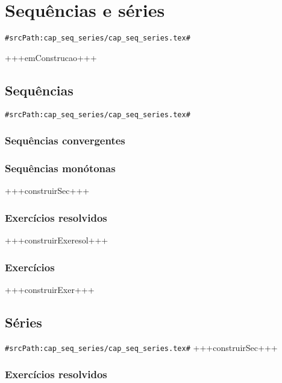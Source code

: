 
\chapter{Sequências e séries}
\verb+#srcPath:cap_seq_series/cap_seq_series.tex#+
\label{cap:seq_series}

+++emConstrucao+++

\section{Sequências}
\verb+#srcPath:cap_seq_series/cap_seq_series.tex#+
\subsection{Sequências convergentes}
\subsection{Sequências monótonas}
+++construirSec+++
\subsection*{Exercícios resolvidos}

+++construirExeresol+++


\subsection*{Exercícios}

+++construirExer+++


\section{Séries}
\verb+#srcPath:cap_seq_series/cap_seq_series.tex#+
+++construirSec+++

\subsection*{Exercícios resolvidos}

